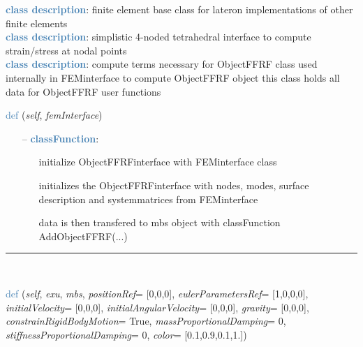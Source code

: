 \begin{itemize}[leftmargin=1.4cm]
\begin{itemize}[leftmargin=1.4cm]
\begin{itemize}[leftmargin=1.4cm]
\begin{itemize}[leftmargin=0.5cm]
\begin{itemize}[leftmargin=1.4cm]
\begin{itemize}[leftmargin=1.4cm]
\begin{itemize}[leftmargin=0.5cm]
%
\noindent\textcolor{steelblue}{{\bf class description}}:  finite element base class for lateron implementations of other finite elements
\vspace{3pt} \\ 
\noindent\textcolor{steelblue}{{\bf class description}}:  simplistic 4-noded tetrahedral interface to compute strain/stress at nodal points
\vspace{3pt} \\ 
\noindent\textcolor{steelblue}{{\bf class description}}:  compute terms necessary for ObjectFFRF
class used internally in FEMinterface to compute ObjectFFRF object
this class holds all data for ObjectFFRF user functions
\vspace{3pt} \\ 
\begin{flushleft}
\noindent \textcolor{steelblue}{def {\bf {}}}\label{sec:FEM:ObjectFFRFinterface:__init__}
({\it self}, {\it femInterface})
\end{flushleft}
\setlength{\itemindent}{0.7cm}
\begin{itemize}[leftmargin=0.7cm]
\item[--]\textcolor{steelblue}{\bf classFunction}: \vspace{-6pt}
\begin{itemize}[leftmargin=1.2cm]
\setlength{\itemindent}{-0.7cm}
\item[]initialize ObjectFFRFinterface with FEMinterface class
\item[]initializes the ObjectFFRFinterface with nodes, modes, surface description and systemmatrices from FEMinterface
\item[]data is then transfered to mbs object with classFunction AddObjectFFRF(...)
\end{itemize}
\vspace{12pt}\end{itemize}
%
\noindent\rule{8cm}{0.75pt}\vspace{1pt} \\ 
\begin{flushleft}
\noindent \textcolor{steelblue}{def {\bf {}}}\label{sec:FEM:ObjectFFRFinterface:AddObjectFFRF}
({\it self}, {\it exu}, {\it mbs}, {\it positionRef}= [0,0,0], {\it eulerParametersRef}= [1,0,0,0], {\it initialVelocity}= [0,0,0], {\it initialAngularVelocity}= [0,0,0], {\it gravity}= [0,0,0], {\it constrainRigidBodyMotion}= True, {\it massProportionalDamping}= 0, {\it stiffnessProportionalDamping}= 0, {\it color}= [0.1,0.9,0.1,1.])

\end{flushleft}
\end{itemize}
\end{itemize}
\end{itemize}
\end{itemize}
\end{itemize}
\end{itemize}
\end{itemize}
